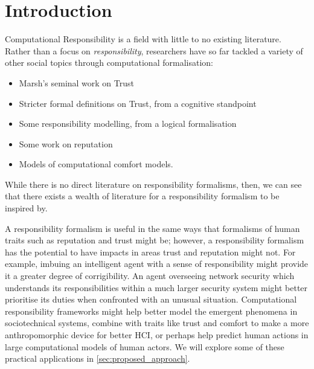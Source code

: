\chapter{Introduction}\label{sec:intro}

Computational Responsibility is a field with little to no existing literature. Rather than a focus on \emph{responsibility}, researchers have so far tackled a variety of other social topics through computational formalisation:

\begin{itemize}
    \item Marsh's seminal work on Trust\cite{Marsh1994FormalisingConcept}
    
    \item Stricter formal definitions on Trust, from a cognitive standpoint\cite{CastelfranchiSocialApproach}
    
    \item Some responsibility modelling, from a logical formalisation\cite{Simpson2015FormalisingAnalysis}
    
    \item Some work on reputation~\cite{Chandrasekaran2011ASystems}

    \item Models of computational comfort models\cite{Marsh2011}.
    
\end{itemize}

While there is no direct literature on responsibility formalisms, then, we can see that there exists a wealth of literature for a responsibility formalism to be inspired by.\par

A responsibility formalism is useful in the same ways that formalisms of human traits such as reputation and trust might be; however, a responsibility formalism has the potential to have impacts in areas trust and reputation might not. For example, imbuing an intelligent agent with a sense of responsibility might provide it a greater degree of corrigibility\cite{corrigibility}. An agent overseeing network security which understands its responsibilities within a much larger security system might better prioritise its duties when confronted with an unusual situation. Computational responsibility frameworks might help better model the emergent phenomena in sociotechnical systems, combine with traits like trust and comfort to make a more anthropomorphic device for better HCI, or perhaps help predict human actions in large computational models of human actors. We will explore some of these practical applications in \cref{sec:proposed_approach}.\par

